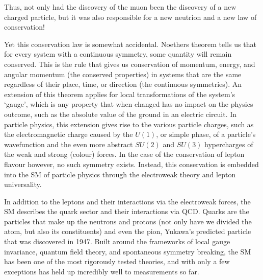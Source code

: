 Thus, not only had the discovery of the muon been the discovery of a new charged particle, but it was also responsible for a new neutrion and a new law of conservation!

Yet this conservation law is somewhat accidental.
Noethers theorem tells us that for every system with a continuous symmetry, some quantity will remain conserved.
This is the rule that gives us conservation of momentum, energy, and angular momentum (the conserved properties) in systems that are the same regardless of their place, time, or direction (the continuous symmetries).
An extension of this theorem applies for local transformations of the system's `gauge', which is any property that when changed has no impact on the physics outcome, such as the absolute value of the ground in an electric circuit.
In particle physics, this extension gives rise to the various particle charges, such as the electromagnetic charge caused by the $U(1)$, or simple phase, of a particle's wavefunction and the even more abstract $SU(2)$ and $SU(3)$ hypercharges of the weak and strong (colour) forces.
In the case of the conservation of lepton flavour however, no such symmetry exists.
Instead, this conservation is embedded into the \ac{SM} of particle physics through the electroweak theory and lepton universality.

In addition to the leptons and their interactions via the electroweak forces, the \ac{SM} describes the quark sector and their interactions via \ac{QCD}.
Quarks are the particles that make up the neutrons and protons (not only have we divided the atom, but also its constituents) and even the pion, Yukawa's predicted particle that was discovered in 1947.
Built around the frameworks of local gauge invariance, quantum field theory, and spontaneous symmetry breaking, the \ac{SM} has been one of the most rigorously tested theories, and with only a few exceptions has held up incredibly well to measurements so far.

